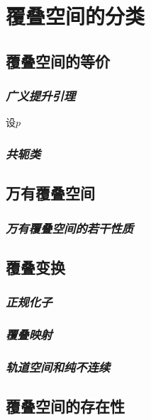 \chapter{覆叠空间的分类}

\section{覆叠空间的等价}

\subsection*{\textsl{广义提升引理}}

\begin{mdframed}
    \begin{lemma}
        设$p$
    \end{lemma}
\end{mdframed}

\subsection*{\textsl{共轭类}}

\section{万有覆叠空间}

\subsection{\textsl{万有覆叠空间的若干性质}}

\section{覆叠变换}

\subsection*{\textsl{正规化子}}

\subsection*{\textsl{覆叠映射}}

\subsection*{\textsl{轨道空间和纯不连续}}

\section{覆叠空间的存在性}